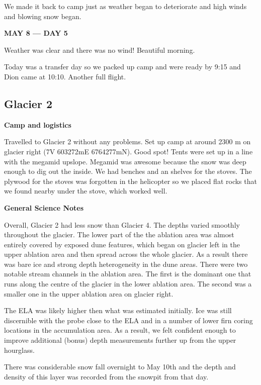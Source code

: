 \documentclass[12pt]{article}
\begin{document}
We made it back to camp just as weather began to deteriorate and high winds and blowing snow began. 

\vspace{4mm}
\noindent \textbf{MAY 8 --- DAY 5}

Weather was clear and there was no wind! Beautiful morning.

Today was a transfer day so we packed up camp and were ready by 9:15 and Dion came at 10:10. Another full flight. 

\subsection{Glacier 2}

\textbf{Camp and logistics}

Travelled to Glacier 2 without any problems. Set up camp at around 2300 m on glacier right (7V 603272mE 6764277mN). Good spot! Tents were set up in a line with the megamid upslope. Megamid was awesome because the snow was deep enough to dig out the inside. We had benches and an shelves for the stoves. The plywood for the stoves was forgotten in the helicopter so we placed flat rocks that we found nearby under the stove, which worked well. 

\vspace{4mm}
\noindent \textbf{General Science Notes}

Overall, Glacier 2 had less snow than Glacier 4. The depths varied smoothly throughout the glacier. The lower part of the the ablation area was almost entirely covered by exposed dune features, which began on glacier left in the upper ablation area and then spread across the whole glacier. As a result there was bare ice and strong depth heterogeneity in the dune areas. There were two notable stream channels in the ablation area. The first is the dominant one that runs along the centre of the glacier in the lower ablation area. The second was a smaller one in the upper ablation area on glacier right. 

The ELA was likely higher then what was estimated initially. Ice was still discernible with the probe close to the ELA and in a number of lower firn coring locations in the accumulation area. As a result, we felt confident enough to improve additional (bonus) depth measurements further up from the upper hourglass. 

There was considerable snow fall overnight to May 10th and the depth and density of this layer was recorded from the snowpit from that day. 
\end{document}
